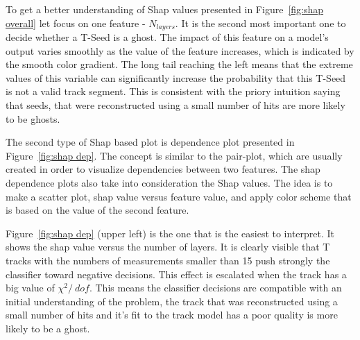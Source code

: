 To get a better understanding of Shap values presented in Figure~\ref{fig:shap overall} let focus on one feature - $N_{layers}$. It is the second most important one to decide whether a T-Seed is a ghost. The impact of this feature on a model's output varies smoothly as the value of the feature increases, which is indicated by the smooth color gradient. The long tail reaching the left means that the extreme values of this variable can significantly increase the probability that this T-Seed is not a valid track segment. This is consistent with the priory intuition saying that seeds, that were reconstructed using a small number of hits are more likely to be ghosts. 

The second type of Shap based plot is dependence plot presented in Figure~\ref{fig:shap dep}.  The concept is similar to the pair-plot, which are usually created in order to visualize dependencies between two features. The shap dependence plots also take into consideration the Shap values. The idea is to make a scatter plot, shap value versus feature value, and apply color scheme that is based on the value of the second feature.

 Figure~\ref{fig:shap dep} (upper left) is the one that is the easiest to interpret. It shows the shap value versus the number of layers. It is clearly visible that T tracks with the numbers of measurements smaller than 15 push strongly the classifier toward negative decisions. This effect is escalated when the track has a big value of $\chi^2 /\ dof $. This means the classifier decisions are compatible with an initial understanding of the problem, the track that was reconstructed using a small number of hits and it's fit to the track model has a poor quality is more likely to be a ghost. 


